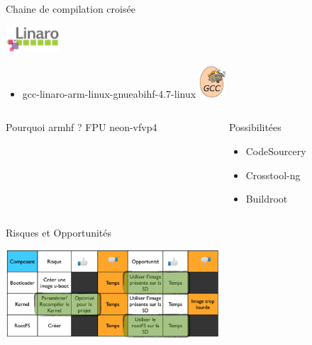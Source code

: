 \documentclass[11pt]{beamer}
\begin{document}
	
	\begin{frame}{Chaine de compilation croisée}
	\begin{center}
	  \includegraphics[width=2cm]{common/linaro.jpeg}
	\end{center}
	\begin{itemize}
			\item gcc-linaro-arm-linux-gnueabihf-4.7-linux
			\includegraphics[width=1cm]{common/gnu.jpeg}
	\end{itemize}
	\begin{columns}[t]
	\begin{column}{5cm}
	\begin{block}{Pourquoi armhf ?}
		FPU neon-vfvp4
	\end{block}
	\end{column}
	\begin{column}{5cm}
	\begin{block}{Possibilitées}
	\begin{itemize}
	      \item CodeSourcery
	      \item Crosstool-ng
	      \item Buildroot
	\end{itemize}
	\end{block}
	\end{column}
	\end{columns}
	\end{frame}
	
	\begin{frame}{Risques et Opportunités}
	\begin{center}
	  \includegraphics[width=8cm]{common/risques.png}\\
	\end{center}
	\end{frame}
	
\end{document}
